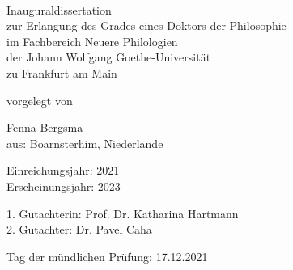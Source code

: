 \documentclass[hidelinks,a4paper,twoside,openright,14pt]{memoir}
\begin{document}

\frontmatter

\begin{titlingpage}

\phantom{xx}

\newpage

\center

\large

\thispagestyle{empty}
\phantom{xx}

\vspace{3em}

\thispagestyle{empty}

{\Large
{}}\\

\vspace{5em}

Inauguraldissertation\\
zur Erlangung des Grades eines Doktors der Philosophie\\
im Fachbereich Neuere Philologien\\
der Johann Wolfgang Goethe-Universität\\
zu Frankfurt am Main\\

\vspace{5em}

vorgelegt von\\

\vspace{2em}

Fenna Bergsma\\
aus: Boarnsterhim, Niederlande\\

\vspace{3em}

Einreichungsjahr: 2021\\
Erscheinungsjahr: 2023\\

\vspace{5em}

\normalsize

\thispagestyle{empty}

{\raggedright

1. Gutachterin: Prof. Dr. Katharina Hartmann\\
2. Gutachter: Dr. Pavel Caha\\

\thispagestyle{empty}

\vspace{1em}

Tag der mündlichen Prüfung: 17.12.2021


}

\end{titlingpage}
\end{document}
